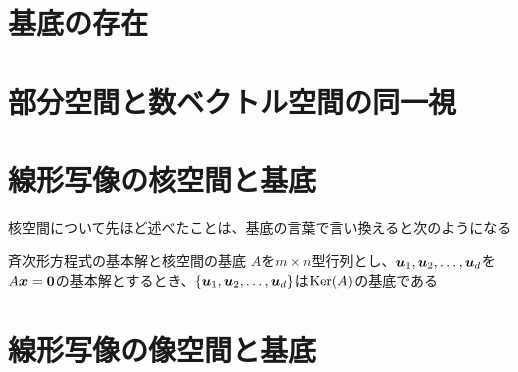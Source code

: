 \documentclass[../../../topic_linear-algebra]{subfiles}
\begin{document}
\sectionline
\section{基底の存在}


\sectionline
\section{部分空間と数ベクトル空間の同一視}


\sectionline
\section{線形写像の核空間と基底}

核空間について先ほど述べたことは、基底の言葉で言い換えると次のようになる

\begin{theorem}{斉次形方程式の基本解と核空間の基底}
  $A$を$m \times n$型行列とし、$\vb*{u}_1, \vb*{u}_2, \dots, \vb*{u}_d$を$A\vb*{x} = \vb*{0}$の基本解とするとき、$\{ \vb*{u}_1, \vb*{u}_2, \dots, \vb*{u}_d \}$は$\operatorname{Ker}(A)$の基底である
\end{theorem}

\sectionline
\section{線形写像の像空間と基底}

\end{document}

